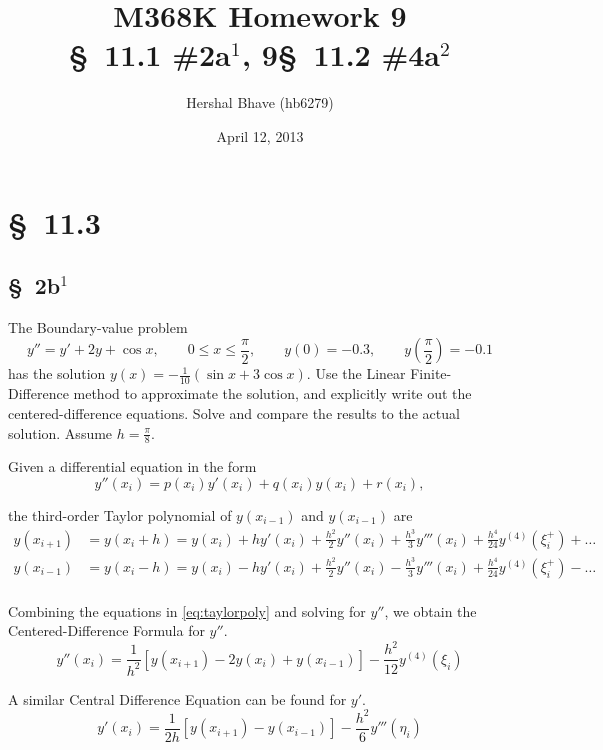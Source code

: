 \documentclass[12pt]{article}
\title{M368K Homework 9 \\
  \normalsize{\S~11.1 \#2a$^1$, 9\quad \S~11.2 \#4a$^2$}}
\author{Hershal Bhave (hb6279)}
\date{April 12, 2013}
\begin{document}
\maketitle

\section{\S~11.3}
\subsection{\S~2b$^1$}

The Boundary-value problem
$$ y'' = y'+2y+\cos x, \qquad 0\leq x\leq\frac{\pi}{2},\qquad y(0)=-0.3,\qquad y\left(\frac{\pi}{2}\right)=-0.1 $$
has the solution $y(x) = -\frac{1}{10}(\sin x + 3\cos x)$. Use the
Linear Finite-Difference method to approximate the solution, and
explicitly write out the centered-difference equations. Solve and
compare the results to the actual solution. Assume $h=\frac{\pi}{8}$.

Given a differential equation in the form
\begin{equation}
  \label{eq:gendiff}
  y''(x_i)=p(x_i)y'(x_i)+q(x_i)y(x_i)+r(x_i),
\end{equation}

the third-order Taylor polynomial of $y(x_{i-1})$ and $y(x_{i-1})$ are
\begin{equation}
  \label{eq:taylorpoly}
  \begin{aligned}
    y(x_{i+1}) &= y(x_i+h) = y(x_i) + hy'(x_i)+\frac{h^2}{2}y''(x_i) + \frac{h^3}{3}y'''(x_i)+\frac{h^4}{24}y^{(4)}(\xi_i^+)+\ldots\\
    y(x_{i-1}) &= y(x_i-h) = y(x_i) - hy'(x_i)+\frac{h^2}{2}y''(x_i)
    - \frac{h^3}{3}y'''(x_i)+\frac{h^4}{24}y^{(4)}(\xi_i^+)-\ldots \\
  \end{aligned}
\end{equation}

Combining the equations in \cref{eq:taylorpoly} and solving for $y''$, we obtain the
Centered-Difference Formula for $y''$.
\begin{equation}
  \label{eq:centdiffypp}
  y''(x_i)=\frac{1}{h^2}[y(x_{i+1})-2y(x_i)+y(x_{i-1})]-\frac{h^2}{12}y^{(4)}(\xi_i)
\end{equation}

A similar Central Difference Equation can be found for $y'$.
\begin{equation}
  \label{eq:centdiffyp}
  y'(x_i)=\frac{1}{2h}[y(x_{i+1})-y(x_{i-1})]-\frac{h^2}{6}y'''(\eta_i)
\end{equation}
\end{document}
